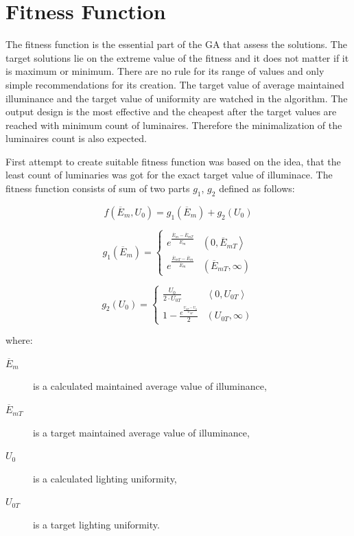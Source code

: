 \section{Fitness Function}
The fitness function is the essential part of the GA that assess the solutions. The target solutions lie on the extreme value of the fitness and it does not matter if it is maximum or minimum. There are no rule for its range of values and only simple recommendations for its creation. The target value of average maintained illuminance and the target value of uniformity are watched in the algorithm. The output design is the most effective and the cheapest after the target values are reached with minimum count of luminaires. Therefore the minimalization of the luminaires count is also expected.

First attempt to create suitable fitness function was based on the idea, that the least count of luminaries was got for the exact target value of illuminace. The fitness function consists of sum of two parts $g_1$, $g_2$ defined as follows:

\begin{equation}
\label{eq:fitV1}
f\left(\overline{E}_{m}, U_0\right) = g_1\left(\overline{E}_{m}\right) + g_2\left(U_0\right)
\end{equation}

\begin{equation}
\label{eq:fitV1G1}
	g_1\left(\overline{E}_{m}\right)=
	\begin{cases} 
		e^{\frac{\overline{E}_{m}-\overline{E}_{mT}}{\overline{E}_{m}}} & \left( 0, \overline{E}_{mT}\right\rangle\\
		e^{\frac{\overline{E}_{mT}-\overline{E}_{m}}{\overline{E}_{m}}} & \left( \overline{E}_{mT}, \infty\right)
	\end{cases}
\end{equation}

\begin{equation}
\label{eq:fitV1G2}
	g_2\left(U_0\right)=
	\begin{cases} 
		\frac{U_0}{2\cdot U_{0T}} & \left\langle 0, U_{0T}\right\rangle\\
		1-\frac{e^{\frac{U_{0T}-U_0}{U_{0T}}}}{2} & \left( U_{0T}, \infty\right)
	\end{cases}
\end{equation}

\noindent where:
\begin{description}
	\item[$\overline{E}_{m}$] is a calculated maintained average value of illuminance,
	\item[$\overline{E}_{mT}$] is a target maintained average value of illuminance,
	\item[$U_0$] is a calculated lighting uniformity,
	\item[$U_{0T}$] is a target lighting uniformity.
\end{description}

